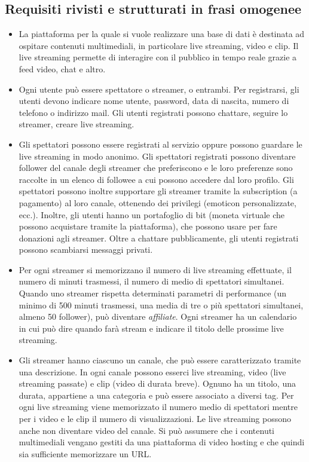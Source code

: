 \subsection{Requisiti rivisti e strutturati in frasi omogenee}
\begin{itemize}
    \item La piattaforma per la quale si vuole realizzare una base di dati è destinata ad ospitare contenuti multimediali, in particolare live streaming, video e clip.
    Il live streaming permette di interagire con il pubblico in tempo reale grazie a feed video, chat e altro.
    \item Ogni utente può essere spettatore o streamer, o entrambi. Per registrarsi, gli utenti devono indicare nome utente, password, data di nascita, numero di telefono o indirizzo mail. Gli utenti registrati possono chattare, seguire lo streamer, creare live streaming.
    \item Gli spettatori possono essere registrati al servizio oppure possono guardare le live streaming in modo anonimo. Gli spettatori registrati possono diventare follower del canale degli streamer che preferiscono e le loro preferenze sono raccolte in un elenco di followee a cui possono accedere dal loro profilo. Gli spettatori possono inoltre supportare gli streamer tramite la subscription (a pagamento) al loro canale, ottenendo dei privilegi (emoticon personalizzate, ecc.). Inoltre, gli utenti hanno un portafoglio di bit (moneta virtuale che possono acquistare tramite la piattaforma), che possono usare per fare donazioni agli streamer.
    Oltre a chattare pubblicamente, gli utenti registrati possono scambiarsi messaggi privati.
    \item Per ogni streamer si memorizzano il numero di live streaming effettuate, il numero di minuti trasmessi, il numero di medio di spettatori simultanei. 
    Quando uno streamer rispetta determinati parametri di performance (un minimo di 500 minuti trasmessi, una media di tre o più spettatori simultanei, almeno 50 follower), può diventare \textit{affiliate}.
    Ogni streamer ha un calendario in cui può dire quando farà stream e indicare il titolo delle prossime live streaming. 
    \item Gli streamer hanno ciascuno un canale, che può essere caratterizzato tramite una descrizione. In ogni canale possono esserci live streaming, video (live streaming passate) e clip (video di durata breve). Ognuno ha un titolo, una durata, appartiene a una categoria e può essere associato a diversi tag. Per ogni live streaming viene memorizzato il numero medio di spettatori mentre per i video e le clip il numero di visualizzazioni. Le live streaming possono anche non diventare video del canale. Si può assumere che i contenuti multimediali vengano gestiti da una piattaforma di video hosting e che quindi sia sufficiente memorizzare un URL.
\end{itemize}

